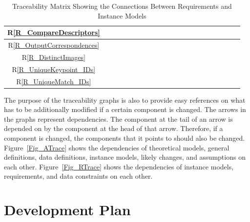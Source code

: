 \documentclass[12pt]{article}
\newcommand{\rref}[1]{R\ref{#1}}
\begin{document}
\begin{table}[h!]
\begin{tabular}{|c|c|c|c|c|c|c|c|c|c|c|c|c|c|c|c|c|c|c|c|c|}
\rref{R_CompareDescriptors}     & & & & & & & & & & & & & & & & & & & & \\ \hline
\rref{R_OutputCorrespondences}  & & & & & & & & & & & & & & & & & & & & \\ \hline
\rref{R_DistinctImages}         & & & & & & & & & & & & & & & & & & & & \\ \hline
\rref{R_UniqueKeypoint_IDs}     & & & & & & & & & & & & & & & & & & & & \\ \hline
\rref{R_UniqueMatch_IDs}        & & & & & & & & & & & & & & & & & & & & \\ \hline
\hline
\end{tabular}
\caption{Traceability Matrix Showing the Connections Between Requirements and Instance Models}
\label{Table:R_trace}
\end{table}

The purpose of the traceability graphs is also to provide easy references on
what has to be additionally modified if a certain component is changed.  The
arrows in the graphs represent dependencies. The component at the tail of an
arrow is depended on by the component at the head of that arrow. Therefore, if a
component is changed, the components that it points to should also be
changed. Figure~\ref{Fig_ATrace} shows the dependencies of theoretical models,
general definitions, data definitions, instance models, likely changes, and
assumptions on each other. Figure~\ref{Fig_RTrace} shows the dependencies of
instance models, requirements, and data constraints on each other.




\section{Development Plan}
\end{document}

